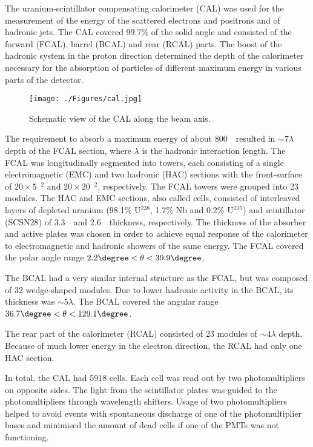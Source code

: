 The uranium-scintillator compensating calorimeter (CAL) was used for the measurement of the energy of the scattered electrons and positrons and of hadronic jets. The CAL covered 99.7\% of the solid angle and consisted of the forward (FCAL), barrel (BCAL) and rear (RCAL) parts. The boost of the hadronic system in the proton direction determined the depth of the calorimeter necessary for the absorption of particles of different maximum energy in various parts of the detector.
\begin{figure}[h]
	\centering
		\texttt{[image: ./Figures/cal.jpg]}
	\caption{Schematic view of the CAL along the beam axis.}
	\label{fig:cal}
\end{figure}

The requirement to absorb a maximum energy of about 800~\GeV\, resulted in $\sim 7 \lambda$ depth of the FCAL section, where $\lambda$ is the hadronic interaction length. The FCAL was longitudinally segmented into towers, each consisting of a single electromagnetic (EMC) and two hadronic (HAC) sections with the front-surface of $20 \times 5$~\cm$^{2}$ and $20 \times 20$~\cm$^{2}$, respectively. The FCAL towers were grouped into 23 modules. The HAC and EMC sections, also called cells, consisted of interleaved layers of depleted uranium (98.1\% U$^{238}$, 1.7\% Nb and 0.2\% U$^{235}$) and scintillator (SCSN28) of 3.3~\mm\, and 2.6~\mm\, thickness, respectively. The thickness of the absorber and active plates was chosen in order to achieve equal response of the calorimeter to electromagnetic and hadronic showers of the same energy. The FCAL covered the polar angle range $2.2\degree < \theta < 39.9\degree$.

The BCAL had a very similar internal structure as the FCAL, but was composed of 32 wedge-shaped modules. Due to lower hadronic activity in the BCAL, its thickness was $\sim 5 \lambda$. The BCAL covered the angular range $36.7\degree< \theta <129.1\degree$.

The rear part of the calorimeter (RCAL) consisted of 23 modules of $\sim 4 \lambda$ depth. Because of much lower energy in the electron direction, the RCAL had only one HAC section.

In total, the CAL had 5918 cells. Each cell was read out by two photomultipliers on opposite sides. The light from the scintillator plates was guided to the photomultipliers through wavelength shifters. Usage of two photomultipliers helped to avoid events with spontaneous discharge of one of the photomultiplier bases and minimised the amount of dead cells if one of the PMTs was not functioning.

